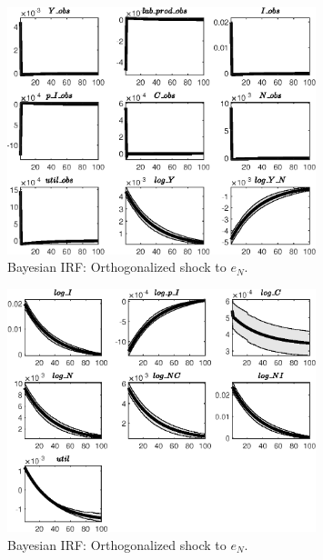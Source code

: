 \begin{figure}[H]
\centering 
\includegraphics[width=0.80\textwidth]{BRS_imp_mobility/Output/BRS_imp_mobility_Bayesian_IRF_e_N_1}
\caption{Bayesian IRF: Orthogonalized shock to ${e_N}$.}
\label{Fig:BayesianIRF:e_N:1}
\end{figure}
 
\begin{figure}[H]
\centering 
\includegraphics[width=0.80\textwidth]{BRS_imp_mobility/Output/BRS_imp_mobility_Bayesian_IRF_e_N_2}
\caption{Bayesian IRF: Orthogonalized shock to ${e_N}$.}
\label{Fig:BayesianIRF:e_N:2}
\end{figure}
 
